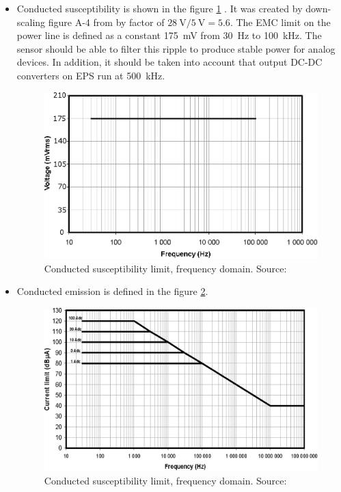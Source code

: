         \begin{itemize}
            \item Conducted susceptibility is shown in the figure \ref{EMC_conducted_susceptibility} . It was created by down-scaling figure A-4 from \cite{ECSS_E_ST_20_07C} by factor of $\SI{28}{\volt}/\SI{5}{\volt} = 5.6$. The EMC limit on the power line is defined as a constant \SI{175}{\milli\volt} from \SI{30}{\hertz} to \SI{100}{\kilo\hertz}. The sensor should be able to filter this ripple to produce stable power for analog devices. In addition, it should be taken into account that output DC-DC converters on EPS run at \SI{500}{\kilo\hertz}.

            \begin{figure}[H]
                \centering
                \includegraphics[width=0.5\paperwidth]{img/04/EMC_conducted_susceptibility.eps}
                \caption{Conducted susceptibility limit, frequency domain. Source: \cite{ECSS_E_ST_20_07C}}
                \label{EMC_conducted_susceptibility}
            \end{figure}


            \item Conducted emission is defined in the figure \ref{EMC_conducted_emission}.

            \begin{figure}[H]
                \centering
                \includegraphics[width=0.5\paperwidth]{img/04/EMC_conducted_emission.eps}
                \caption{Conducted susceptibility limit, frequency domain. Source: \cite{ECSS_E_ST_20_07C}}
                \label{EMC_conducted_emission}
            \end{figure}



\end{itemize}
